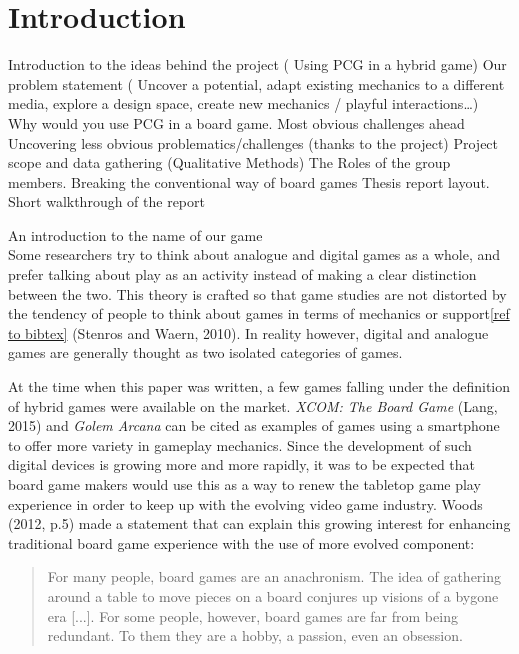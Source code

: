 \chapter{Introduction}
Introduction to the ideas behind the project  ( Using PCG in a hybrid game)
Our problem statement ( Uncover a potential, adapt existing mechanics to a different media, explore a design space, create new mechanics / playful interactions…)
Why would you use PCG in a board game.
Most obvious challenges ahead
Uncovering less obvious problematics/challenges (thanks to the project)
Project scope and data gathering (Qualitative Methods)
The Roles of the group members.
Breaking the conventional way of board games
Thesis report layout. Short walkthrough of the report

An introduction to the name of our game\\



Some researchers try to think about analogue and digital games as a whole, and prefer talking about play as an activity instead of making a clear distinction between the two. This theory is crafted so that game studies are not distorted by the tendency of people to think about games in terms of mechanics or support\ref{ref to bibtex} (Stenros and Waern, 2010). In reality however, digital and analogue games are generally thought as two isolated categories of games.

At the time when this paper was written, a few games falling under the definition of hybrid games were available on the market. \textit{XCOM: The Board Game} (Lang, 2015)\cite{game:xcomtbg} and \textit{Golem Arcana} can be cited as examples of games using a smartphone to offer more variety in gameplay mechanics. Since the development of such digital devices is growing more and more rapidly, it was to be expected that board game makers would use this as a way to renew the tabletop game play experience in order to keep up with the evolving video game industry. Woods (2012, p.5) made a statement that can explain this growing interest for enhancing traditional board game experience with the use of more evolved component:

\begin{quotation}
For many people, board games are an anachronism. The idea of gathering around a table to move pieces on a board conjures up visions of a bygone era [...]. For some people, however, board games are far from being redundant. To them they are a hobby, a passion, even an obsession.
\end{quotation}

